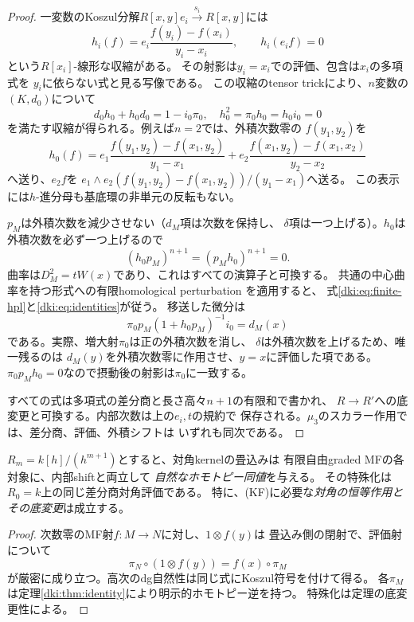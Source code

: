 \begin{proof}
一変数のKoszul分解$R[x,y]e_i\xrightarrow{s_i}R[x,y]$には
\[
 h_i(f)=e_i\frac{f(y_i)-f(x_i)}{y_i-x_i},\qquad
 h_i(e_if)=0
\]
という$R[x_i]$-線形な収縮がある。
その射影は$y_i=x_i$での評価、包含は$x_i$の多項式を
$y_i$に依らない式と見る写像である。
この収縮のtensor trickにより、$n$変数の$(K,d_0)$について
\[
 d_0h_0+h_0d_0=1-i_0\pi_0,\quad
 h_0^2=\pi_0h_0=h_0i_0=0
\]
を満たす収縮が得られる。例えば$n=2$では、外積次数零の
$f(y_1,y_2)$を
\[
 h_0(f)=
 e_1\frac{f(y_1,y_2)-f(x_1,y_2)}{y_1-x_1}
 +e_2\frac{f(x_1,y_2)-f(x_1,x_2)}{y_2-x_2}
\]
へ送り、$e_2f$を
$e_1\wedge e_2(f(y_1,y_2)-f(x_1,y_2))/(y_1-x_1)$へ送る。
この表示には$h$-進分母も基底環の非単元の反転もない。

$p_M$は外積次数を減少させない（$d_M$項は次数を保持し、
$\delta$項は一つ上げる）。$h_0$は外積次数を必ず一つ上げるので
\[
 (h_0p_M)^{n+1}=(p_Mh_0)^{n+1}=0.
\]
曲率は$D_M^2=tW(x)$であり、これはすべての演算子と可換する。
共通の中心曲率を持つ形式への有限homological perturbation
\cite[Appendix~A, Lemma~A.1]{DKITu}を適用すると、
式\eqref{dki:eq:finite-hpl}と\eqref{dki:eq:identities}が従う。
移送した微分は
\[
 \pi_0p_M(1+h_0p_M)^{-1}i_0=d_M(x)
\]
である。実際、増大射$\pi_0$は正の外積次数を消し、
$\delta$は外積次数を上げるため、唯一残るのは
$d_M(y)$を外積次数零に作用させ、$y=x$に評価した項である。
$\pi_0p_Mh_0=0$なので摂動後の射影は$\pi_0$に一致する。

すべての式は多項式の差分商と長さ高々$n+1$の有限和で書かれ、
$R\to R'$への底変更と可換する。内部次数は上の$e_i,t$の規約で
保存される。$\mu_3$のスカラー作用では、差分商、評価、外積シフトは
いずれも同次である。
\end{proof}

\begin{corollary}[自然な対角評価と有限Artinでの恒等性]
\label{dki:cor:unit}
$R_m=k[h]/(h^{m+1})$とすると、対角kernelの畳込みは
有限自由graded MFの各対象に、内部shiftと両立して
\emph{自然なホモトピー同値}を与える。
その特殊化は$R_0=k$上の同じ差分商対角評価である。
特に、(KF)に必要な\emph{対角の恒等作用とその底変更}は成立する。
\end{corollary}
\begin{proof}
次数零のMF射$f:M\to N$に対し、$1\otimes f(y)$は
畳込み側の閉射で、評価射について
\[
 \pi_N\circ(1\otimes f(y))=f(x)\circ\pi_M
\]
が厳密に成り立つ。高次のdg自然性は同じ式にKoszul符号を付けて得る。
各$\pi_M$は定理\ref{dki:thm:identity}により明示的ホモトピー逆を持つ。
特殊化は定理の底変更性による。
\end{proof}

